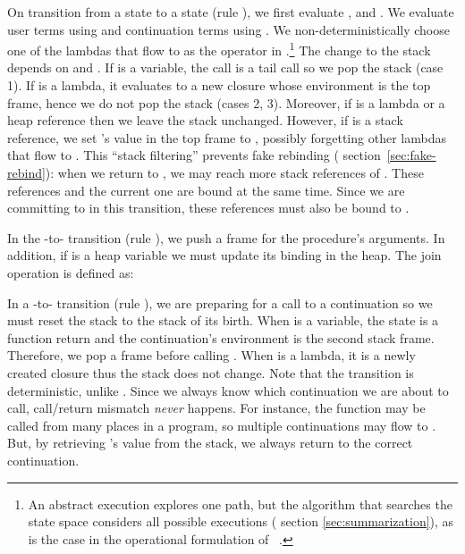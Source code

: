 \documentclass{LMCS}
\theoremstyle{definition} \newtheorem{property}[thm]{Property}
\begin{document}
On transition from a \daueval{} state \astat{} to a \dauapply{} state 
(rule ), we first evaluate ,  and .
We evaluate user terms using \ubigaNA{} and continuation terms using \kbigaNA.
We non-deterministically choose one of the lambdas that flow to  as the
operator in .\footnote{An abstract execution explores one path, but the
algorithm that searches the state space considers all possible executions
(\confer{} section \ref{sec:summarization}), as is the case in the operational
formulation of \kcfa~\cite{diss/07/might/dcfa}.}
The change to the stack depends on  and .
If  is a variable, the call is a tail call so we pop the stack (case 1).
If  is a lambda, it evaluates to a new closure whose environment is the top 
frame, hence we do not pop the stack (cases 2, 3).
Moreover, if  is a lambda or a heap reference then we leave the
stack unchanged.
However, if  is a stack reference, we set 's value in the top 
frame to \mset{\mulam}, possibly forgetting other lambdas that flow to .
This ``stack filtering'' prevents fake 
rebinding ({\confer} section~\ref{sec:fake-rebind}):
when we return to \acarg{}, we may reach more stack references of .
These references and the current one are bound at the same time.
Since we are committing to \mulam{} in this transition, 
these references must also be bound to \mulam.

In the \dauapply-to-\daeval{} transition (rule ), we push a frame for
the procedure's arguments.
In addition, if  is a heap variable we must update its binding in the heap.
The join operation \join{} is defined as:
\begin{center}
  
\end{center}

In a \daceval-to-\dacapply{} transition (rule ), we are preparing for
a call to a continuation so we must reset the stack to the stack of its birth. 
When  is a variable, the \daceval{} state is a function return and the
continuation's environment is the second stack frame.
Therefore, we pop a frame before calling \mclam.
When  is a lambda, 
it is a newly created closure thus the stack does not change.
Note that the transition is deterministic, unlike .
Since we always know which continuation we are about to call, call/return
mismatch \emph{never} happens.
For instance, the function  may be called from many places in a program,
so multiple continuations may flow to .
But, by retrieving 's value from the stack, we always return to the 
correct continuation.
\end{document}
